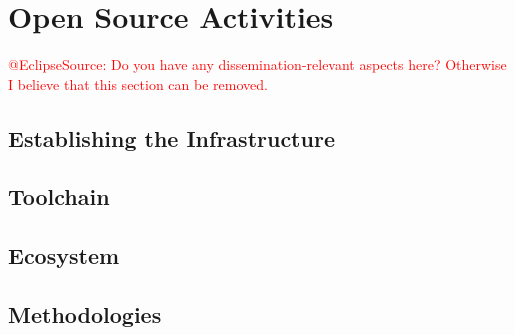\section{Open Source Activities}\label{sct:open_source}
\textcolor{red}{@EclipseSource: Do you have any dissemination-relevant aspects here? Otherwise I believe that this section can be removed.}

\subsection{Establishing the Infrastructure}

\subsection{Toolchain}

\subsection{Ecosystem}

\subsection{Methodologies}

